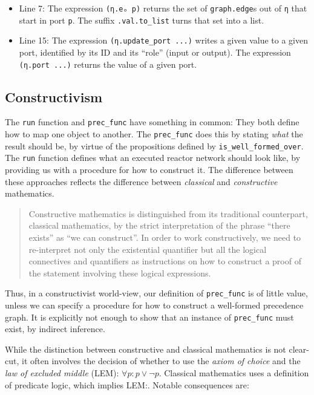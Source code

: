 \begin{itemize}
  \item Line 7:
  The expression \lstinline{(η.eₒ p)} returns the set of \lstinline{graph.edge}s out of \lstinline{η} that start in port \lstinline{p}.
  The suffix \lstinline{.val.to_list} turns that set into a list.
  \item Line 15:
  The expression \lstinline{(η.update_port ...)} writes a given value to a given port, identified by its ID and its ``role'' (input or output).
  The expression \lstinline{(η.port ...)} returns the value of a given port.
\end{itemize}

\subsection{Constructivism}
\label{section:classical-vs-constructive}

The \lstinline{run} function and \lstinline{prec_func} have something in common:
They both define how to map one object to another.
The \lstinline{prec_func} does this by stating \emph{what} the result should be, by virtue of the propositions defined by \lstinline{is_well_formed_over}.
The \lstinline{run} function defines what an executed reactor network should look like, by providing us with a procedure for how to construct it.
The difference between these approaches reflects the difference between \emph{classical} and \emph{constructive} mathematics.

\begin{quote}
Constructive mathematics is distinguished from its traditional counterpart, classical mathematics, by the strict interpretation of the phrase ``there exists'' as ``we can construct''.
In order to work constructively, we need to re-interpret not only the existential quantifier but all the logical connectives and quantifiers as instructions on how to construct a proof of the statement involving these logical expressions.\hfill\cite{construct}
\end{quote}
  
\noindent Thus, in a constructivist world-view, our definition of \lstinline{prec_func} is of little value, unless we can specify a procedure for how to construct a well-formed precedence graph.
It is explicitly not enough to show that an instance of \lstinline{prec_func} must exist, by indirect inference.

While the distinction between constructive and classical mathematics is not clear-cut, it often involves the decision of whether to use the \emph{axiom of choice} and the \emph{law of excluded middle} (LEM): $\forall p: p \vee \lnot p$. 
Classical mathematics uses a definition of predicate logic, which implies LEM:.
Notable consequences are:

